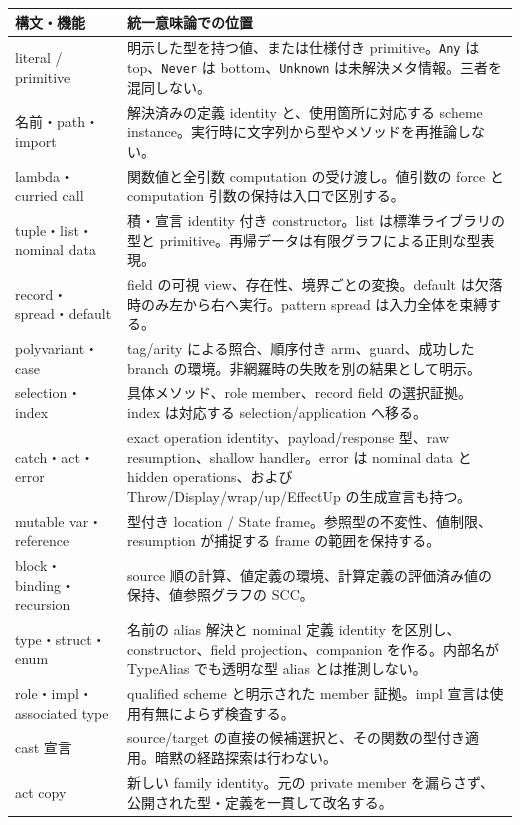 \documentclass[11pt,a4paper]{article}
\theoremstyle{remark}
\begin{document}
\begin{longtable}{p{}p{}}
\toprule
構文・機能 & 統一意味論での位置 \\
\midrule\endhead
literal / primitive & 明示した型を持つ値、または仕様付き primitive。\texttt{Any} は top、\texttt{Never} は bottom、\texttt{Unknown} は未解決メタ情報。三者を混同しない。\\
名前・path・import & 解決済みの定義 identity と、使用箇所に対応する scheme instance。実行時に文字列から型やメソッドを再推論しない。\\
lambda・curried call & 関数値と全引数 computation の受け渡し。値引数の force と computation 引数の保持は入口で区別する。\\
tuple・list・nominal data & 積・宣言 identity 付き constructor。list は標準ライブラリの型と primitive。再帰データは有限グラフによる正則な型表現。\\
record・spread・default & field の可視 view、存在性、境界ごとの変換。default は欠落時のみ左から右へ実行。pattern spread は入力全体を束縛する。\\
polyvariant・case & tag/arity による照合、順序付き arm、guard、成功した branch の環境。非網羅時の失敗を別の結果として明示。\\
selection・index & 具体メソッド、role member、record field の選択証拠。index は対応する selection/application へ移る。\\
catch・act・error & exact operation identity、payload/response 型、raw resumption、shallow handler。error は nominal data と hidden operations、および Throw/Display/wrap/up/EffectUp の生成宣言も持つ。\\
mutable var・reference & 型付き location / State frame。参照型の不変性、値制限、resumption が捕捉する frame の範囲を保持する。\\
block・binding・recursion & source 順の計算、値定義の環境、計算定義の評価済み値の保持、値参照グラフの SCC。\\
type・struct・enum & 名前の alias 解決と nominal 定義 identity を区別し、constructor、field projection、companion を作る。内部名が TypeAlias でも透明な型 alias とは推測しない。\\
role・impl・associated type & qualified scheme と明示された member 証拠。impl 宣言は使用有無によらず検査する。\\
cast 宣言 & source/target の直接の候補選択と、その関数の型付き適用。暗黙の経路探索は行わない。\\
act copy & 新しい family identity。元の private member を漏らさず、公開された型・定義を一貫して改名する。\\

\end{longtable}
\end{document}
